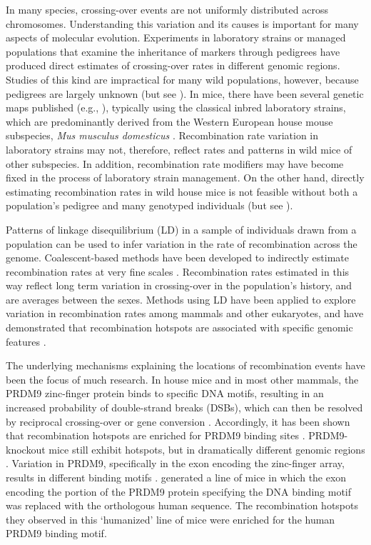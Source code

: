 In many species, crossing-over events are not uniformly distributed across chromosomes. Understanding this variation and its causes is important for many aspects of molecular evolution. Experiments in laboratory strains or managed populations that examine the inheritance of markers through pedigrees have produced direct estimates of crossing-over rates in different genomic regions. Studies of this kind are impractical for many wild populations, however, because pedigrees are largely unknown (but see \citealt{RN250}). In mice, there have been several genetic maps published (e.g., \citealt{RN184,RN263,RN232,RN266}), typically using the classical inbred laboratory strains, which are predominantly derived from the Western European house mouse subspecies, \textit{Mus musculus domesticus} \citep{RN243}. Recombination rate variation in laboratory strains may not, therefore, reflect rates and patterns in wild mice of other subspecies. In addition, recombination rate modifiers may have become fixed in the process of laboratory strain management. On the other hand, directly estimating recombination rates in wild house mice is not feasible without both a population’s pedigree and many genotyped individuals (but see \citealt{RN267}). 
 
        	Patterns of linkage disequilibrium (LD) in a sample of individuals drawn from a population can be used to infer variation in the rate of recombination across the genome. Coalescent-based methods have been developed to indirectly estimate recombination rates at very fine scales \citep{RN261, RN182, RN257, RN260, RN213}. Recombination rates estimated in this way reflect long term variation in crossing-over in the population's history, and are averages between the sexes. Methods using LD have been applied to explore variation in recombination rates among mammals and other eukaryotes, and have demonstrated that recombination hotspots are associated with specific genomic features \citep{RN247, RN258, RN246}.

The underlying mechanisms explaining the locations of recombination events have been the focus of much research. In house mice and in most other mammals, the PRDM9 zinc-finger protein binds to specific DNA motifs, resulting in an increased probability of double-strand breaks (DSBs), which can then be resolved by reciprocal crossing-over or gene conversion \citep{RN245, RN256}. Accordingly, it has been shown that recombination hotspots are enriched for PRDM9 binding sites \citep{RN262, RN156}. PRDM9-knockout mice still exhibit hotspots, but in dramatically different genomic regions \citep{RN254}. Variation in PRDM9, specifically in the exon encoding the zinc-finger array, results in different binding motifs \citep{RN269}. \cite{RN246} generated a line of mice in which the exon encoding the portion of the PRDM9 protein specifying the DNA binding motif was replaced with the orthologous human sequence. The recombination hotspots they observed in this ‘humanized’ line of mice were enriched for the human PRDM9 binding motif. 

